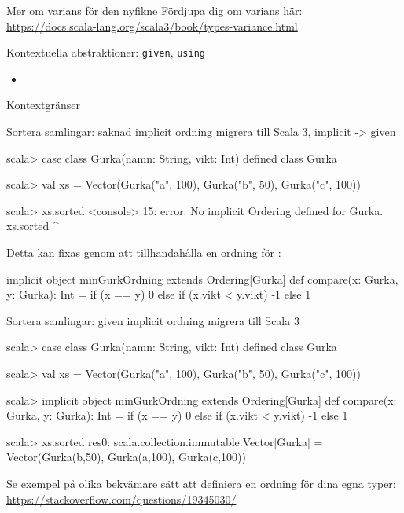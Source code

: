 \begin{Slide}{Mer om varians för den nyfikne}
Fördjupa dig om varians här:\\\url{https://docs.scala-lang.org/scala3/book/types-variance.html}
\end{Slide}




 
\begin{Slide}{Kontextuella abstraktioner: \texttt{given}, \texttt{using}}\SlideFontSmall
\begin{itemize}\SlideFontTiny
\item \TODO {} 
\end{itemize}
\end{Slide}

\begin{Slide}{Kontextgränser}
\TODO {}
\end{Slide}





\begin{Slide}{Sortera samlingar: saknad implicit ordning}
\TODO migrera till Scala 3, implicit -> given
\begin{REPL}
scala> case class Gurka(namn: String, vikt: Int)
defined class Gurka

scala> val xs = Vector(Gurka("a", 100), Gurka("b", 50), Gurka("c", 100))

scala> xs.sorted
<console>:15: error: No implicit Ordering defined for Gurka.
       xs.sorted
          ^
\end{REPL}
\pause
Detta kan fixas genom att tillhandahålla en  ordning för :
\begin{Code}
implicit object minGurkOrdning extends Ordering[Gurka] {
  def compare(x: Gurka, y: Gurka): Int =
    if (x == y) 0
    else if (x.vikt < y.vikt) -1
    else 1
}
\end{Code}
\end{Slide}


\begin{Slide}{Sortera samlingar: given implicit ordning}
\TODO migrera till Scala 3

\begin{REPL}
scala> case class Gurka(namn: String, vikt: Int)
defined class Gurka

scala> val xs = Vector(Gurka("a", 100), Gurka("b", 50), Gurka("c", 100))

scala> implicit object minGurkOrdning extends Ordering[Gurka] {
         def compare(x: Gurka, y: Gurka): Int =
           if (x == y) 0
           else if (x.vikt < y.vikt) -1
           else 1
       }

scala> xs.sorted
res0: scala.collection.immutable.Vector[Gurka] =
        Vector(Gurka(b,50), Gurka(a,100), Gurka(c,100))
\end{REPL}
{\SlideFontTiny Se exempel på olika bekvämare sätt att definiera en ordning för dina egna typer: \\
\url{https://stackoverflow.com/questions/19345030/}}
\end{Slide}


